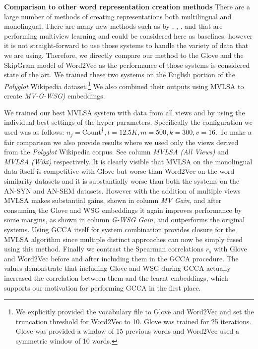 \documentclass[11pt]{article}
\begin{document}
\noindent\textbf{Comparison to other word representation creation
  methods} There are a large number of methods of creating
representations both multilingual and monolingual. There are many new
methods such as by ,
, , and
 that are performing multiview learning and
could be considered here as baselines: however it is not
straight-forward to use those systems to handle the variety of data
that we are using. Therefore, we directly compare our method to the
Glove and the SkipGram model of Word2Vec as the performance of those
systems is considered state of the art.  We trained these two systems
on the English portion of the \textit{Polyglot} Wikipedia
dataset.\footnote{We explicitly provided the
  vocabulary file to Glove and Word2Vec and set the truncation
  threshold for Word2Vec to 10.  Glove was trained for 25
  iterations. Glove was provided a window of 15 previous words and
  Word2Vec used a symmetric window of 10 words.} We also combined
their outputs using MVLSA to create \emph{MV-G-WSG)}
embeddings.

We trained our best MVLSA system with data from all views and by using
the individual best settings of the hyper-parameters. Specifically the
configuration we used was as follows: $n_j = \text{Count}^\frac{1}{4},
t=12.5K, m=500, k=300, v=16$. To make a fair comparison we also
provide results where we used only the views derived from the
\textit{Polyglot} Wikipedia corpus. See column \emph{MVLSA (All
  Views)} and \emph{MVLSA (Wiki)} respectively. It is clearly visible
that MVLSA on the monolingual data itself is competitive with Glove
but worse than Word2Vec on the word similarity datasets and it is
substantially worse than both the systems on the AN-SYN and AN-SEM
datasets. However with the addition of multiple views MVLSA makes
substantial gains, shown in column \emph{MV Gain}, and after consuming
the Glove and WSG embeddings it again improves performance by some
margins, as shown in column \emph{G-WSG Gain}, and outperforms the
original systems.  Using GCCA itself for system combination provides
closure for the MVLSA algorithm since multiple distinct approaches can
now be simply fused using this method. Finally we contrast the
Spearman correlations $r_s$ with Glove and Word2Vec before and after
including them in the GCCA procedure. The values demonstrate that
including Glove and WSG during GCCA actually increased the correlation
between them and the learnt embeddings, which supports our motivation
for performing GCCA in the first place.
\end{document}
